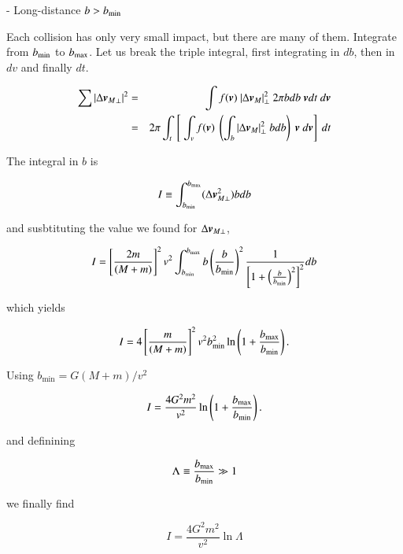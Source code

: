 - Long-distance $b > b_{\rm min}$

Each collision has only very small impact, but there are many of them. Integrate from $b_{\rm min}$ to $b_{\rm max}$. Let us break the triple integral, first integrating in $db$, then in $dv$ and finally $dt$. 

\begin{eqnarray}
\sum |\Delta {{\boldsymbol{v}}_M}_\perp|^2 &=& \int f({\boldsymbol{v}}) \  |\Delta {\boldsymbol{v}}_{M}|_\perp^2 \ 2\pi b db \ {\boldsymbol{v}} dt \ d{\boldsymbol{v}}\\
&=& 2\pi \int_t \ \left[ \ \int_v f({\boldsymbol{v}}) \  \left(\int_b |\Delta {\boldsymbol{v}}_{M}|_\perp^2 \ b db\right) \ {\boldsymbol{v}} \ d{\boldsymbol{v}}\right] \ dt 
\end{eqnarray}

The integral in $b$ is


\begin{equation}
I \equiv \int_{b_{\rm min}}^{b_{\rm max}} (\Delta {\boldsymbol{v}}_{M\perp}^2) b db   
\end{equation}

and susbtituting the value we found for $\Delta {\boldsymbol{v}}_{M\perp}$, 

\begin{equation}
I = \left[\frac{2m}{(M+m)} \right]^2  v^2 \int_{b_{\rm min}}^{b_{\rm max}} b \left(\frac{b}{b_{\rm min}}\right)^2  \frac{1}{\left[1+\left(\frac{b}{b_{\rm min}}\right)^2\right]^2}db   
\end{equation}

which yields

\begin{equation}
I = 4 \left[\frac{m}{(M+m)}\right]^2 v^2 b_{\rm min}^2 \ln \left(1+\frac{b_{\rm max}}{b_{\rm min}}\right).
\end{equation}

Using $b_{\min} = G(M+m)/v^2$


\begin{equation}
I = \frac{4G^2 m^2}{v^2} \ln \left(1+ \frac{b_{\rm max}}{b_{\rm min}}\right).
\end{equation}

and definining

\begin{equation}
\Lambda \equiv \frac{b_{\rm max}}{b_{\rm min}} \gg 1 
\end{equation}

we finally find 

\begin{equation}
\boxed{
I = \frac{4G^2 m^2}{v^2} \ln \Lambda
}
\end{equation}


